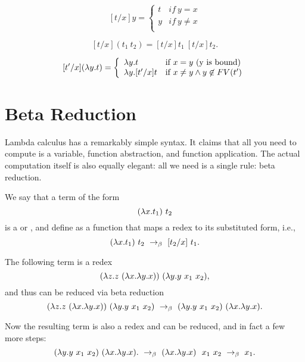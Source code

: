 \begin{definition}
\label{def:lambda:sub-final}
\[
[t/x]y = \left\{ \begin{array}{ll}
        t & if~y = x \\
        y & if~y\neq x \\
        \end{array} \right.
\]


\[
[t/x](t_1~t_2) = [t/x]t_1~[t/x]t_2.
 \]

\[
[t'/x](\lambda y.t) = 
\left\{ \begin{array}{ll}

\lambda y.t &\mbox{if}~ x = y \mbox{ (y is bound)} \\

\lambda y.[t'/x]t &\mbox{if}~ x \neq y \land y \not \in FV(t') \\

\end{array} \right. 
\]
\end{definition}

\section{Beta Reduction}

Lambda calculus has a remarkably simple syntax.  It claims that all you need to compute is a variable,  function abstraction, and function application.
%
The actual computation itself is also equally elegant: all we need is a single rule: beta reduction.
%

\begin{definition}
\label{def:lcb:beta-reduction}
We say that a term of the form 
\[
(\lambda x.t_1)~t_2 
\]
is  a  or ,
%
and
%
define  as a function that maps a redex to its substituted form, i.e.,
\[
(\lambda x.t_1)~t_2 ~\rightarrow_{\beta}~ [t_2/x]~t_1 .
\]
\end{definition}

\begin{example}
The following term is a redex
\[
(\lambda z. z~(\lambda x. \lambda y. x))~(\lambda y. y~x_1~x_2), 
\]
and thus can be reduced via beta reduction
\[
(\lambda z. z~ (\lambda x. \lambda y. x))~(\lambda y. y~x_1~x_2) 
~\rightarrow_{\beta}~
(\lambda y. y~x_1~x_2)~(\lambda x. \lambda y. x).
\]

Now the resulting term is also a redex and can be reduced, and in fact a few more steps:
\[
(\lambda y. y~x_1~x_2)~(\lambda x. \lambda y. x).
~\rightarrow_{\beta}~
(\lambda x. \lambda y. x)~~x_1~x_2
~\rightarrow_{\beta}~
x_1.
\]
\end{example}


